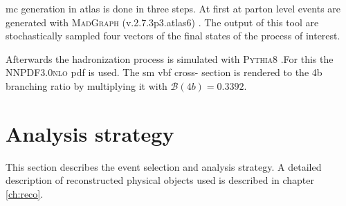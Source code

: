 \ac{mc} generation in \ac{atlas} is done in three steps. At first at parton level events are generated with \textsc{MadGraph} (v.2.7.3p3.atlas6) \citep{alwall2014automated}. The output of this tool are stochastically sampled four vectors of the final states of the process of interest.

Afterwards the hadronization process is simulated with \textsc{Pythia8} \citep{Sjostrand:2014zea}.For this the \textsc{NNPDF3.0nlo} \ac{pdf} is used. The \ac{sm} \ac{vbf} cross-   section is rendered to the 4b branching ratio by multiplying it with $\mathcal{B}(4b)=0.3392$.



\section{Analysis strategy}
This section describes the event selection and analysis strategy. A detailed description of reconstructed physical objects used is described in chapter \ref{ch:reco}.


